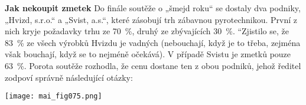 \begin{mdframed}[style=mdexam]
  \begin{example}\label{mai:exam058}
    \textbf{Jak nekoupit zmetek}\newline
      Do finále soutěže o „šmejd roku“ se dostaly dva podniky, „Hvizd, s.r.o.“ a „Svist, a.s.“,
      které zásobují trh zábavnou pyrotechnikou. První z nich kryje požadavky trhu ze
      \qty{70}{\percent}, druhý ze zbývajících \qty{30}{\percent}. “Zjistilo se, že \qty{83}{\percent}
      ze všech výrobků Hvizdu je vadných (nebouchají, když je to třeba, zejména však bouchají, když
      se to nejméně očekává). V případě Svistu je zmetků pouze \qty{63}{\percent}. Porota soutěže
      rozhodla, že cenu dostane ten z obou podniků, jehož ředitel zodpoví správně následující
      otázky:

      {\centering
      \captionsetup{type=figure} 
      \texttt{[image: mai\_fig075.png]}
      \label{mai_fig075}
      \par}


\end{example}
\end{mdframed}
